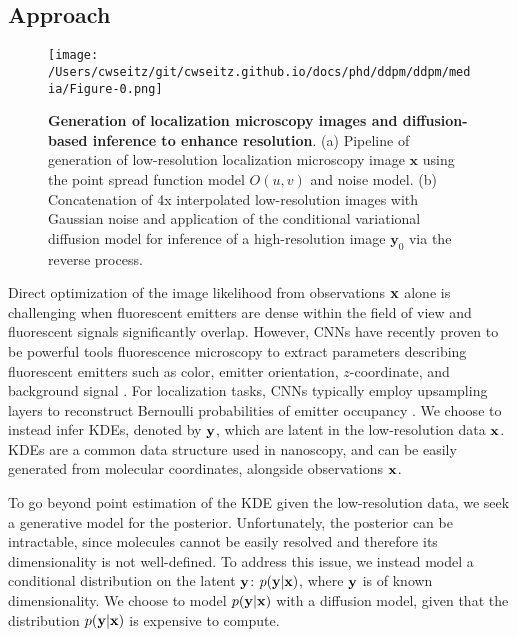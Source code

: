 \subsection{Approach}

\begin{figure}[t]
\centering
\texttt{[image: /Users/cwseitz/git/cwseitz.github.io/docs/phd/ddpm/ddpm/media/Figure-0.png]}
\caption{\textbf{Generation of localization microscopy images and diffusion-based inference to enhance resolution}. (a) Pipeline of generation of low-resolution localization microscopy image $\mathbf{x}$ using the point spread function model $O\left(u,v\right)$ and noise model. (b) Concatenation of 4x interpolated low-resolution images with Gaussian noise and application of the conditional variational diffusion model for inference of a high-resolution image $\mathbf{y}_0$ via the reverse process.}
\label{fig:fig60}
\end{figure}


Direct optimization of the image likelihood from observations $\bold{x}$ alone is challenging when fluorescent emitters are dense within the field of view and fluorescent signals significantly overlap. However, CNNs have recently proven to be powerful tools fluorescence microscopy to extract parameters describing fluorescent emitters such as color, emitter orientation, $z$-coordinate, and background signal \cite{Zhang2018,Kim2019,Zelger2018}. For localization tasks, CNNs typically employ upsampling layers to reconstruct Bernoulli probabilities of emitter occupancy \parencite{Speiser2021,Nehme2020}. We choose to instead infer KDEs, denoted by $\bold{y}$, which are latent in the low-resolution data $\bold{x}$. KDEs are a common data structure used in nanoscopy, and can be easily generated from molecular coordinates, alongside observations $\bold{x}$.

To go beyond point estimation of the KDE given the low-resolution data, we seek a generative model for the posterior. Unfortunately, the posterior can be intractable, since molecules cannot be easily resolved and therefore its dimensionality is not well-defined. To address this issue, we instead model a conditional distribution on the latent $\bold{y}$: $p(\bold{y}\lvert\bold{x})$, where $\bold{y}$ is of known dimensionality. We choose to model $p(\bold{y}\lvert\bold{x})$ with a diffusion model, given that the distribution $p(\bold{y}\lvert\bold{x})$ is expensive to compute.


